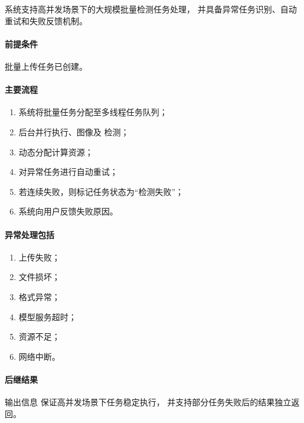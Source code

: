 系统支持高并发场景下的大规模批量检测任务处理，
并具备异常任务识别、自动重试和失败反馈机制。

\paragraph*{前提条件}

批量上传任务已创建。

\paragraph*{主要流程}

\begin{enumerate}
    \item 系统将批量任务分配至多线程任务队列；
    \item 后台并行执行、图像及  检测；
    \item 动态分配计算资源；
    \item 对异常任务进行自动重试；
    \item 若连续失败，则标记任务状态为“检测失败”；
    \item 系统向用户反馈失败原因。
\end{enumerate}

\paragraph*{异常处理包括}

\begin{enumerate}
    \item 上传失败；
    \item 文件损坏；
    \item 格式异常；
    \item 模型服务超时；
    \item 资源不足；
    \item 网络中断。
\end{enumerate}

\paragraph*{后继结果}
输出信息
保证高并发场景下任务稳定执行，
并支持部分任务失败后的结果独立返回。

